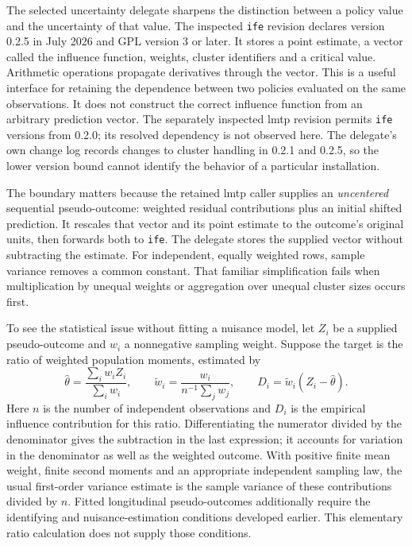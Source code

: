 The selected uncertainty delegate sharpens the distinction between a policy
value and the uncertainty of that value. The inspected \texttt{ife} revision
declares version 0.2.5 in July 2026 and GPL version 3 or later. It stores a
point estimate, a vector called the influence function, weights, cluster
identifiers and a critical value. Arithmetic operations propagate derivatives
through the vector. This is a useful interface for retaining the dependence
between two policies evaluated on the same observations. It does not construct
the correct influence function from an arbitrary prediction vector. The
separately inspected lmtp revision permits \texttt{ife} versions from 0.2.0;
its resolved dependency is not observed here. The delegate's own change log
records changes to cluster handling in 0.2.1 and 0.2.5, so the lower version
bound cannot identify the behavior of a particular installation.
\citep{rel23ife,exec22_lmtp_reuse}

The boundary matters because the retained lmtp caller supplies an
\emph{uncentered} sequential pseudo-outcome: weighted residual contributions
plus an initial shifted prediction. It rescales that vector and its point
estimate to the outcome's original units, then forwards both to \texttt{ife}.
The delegate stores the supplied vector without subtracting the estimate.
For independent, equally weighted rows, sample variance removes a common
constant. That familiar simplification fails when multiplication by unequal
weights or aggregation over unequal cluster sizes occurs first.
\citep{exec22_lmtp_reuse,rel23ifecaller,rel23ife}

To see the statistical issue without fitting a nuisance model, let $Z_i$ be
a supplied pseudo-outcome and $w_i$ a nonnegative sampling weight. Suppose
the target is the ratio of weighted population moments, estimated by
\begin{equation}
 \widehat\theta=\frac{\sum_i w_iZ_i}{\sum_i w_i},\qquad
 \widetilde w_i=\frac{w_i}{n^{-1}\sum_j w_j},\qquad
 D_i=\widetilde w_i(Z_i-\widehat\theta).
 \label{rel23:weighted-influence}
\end{equation}
Here $n$ is the number of independent observations and $D_i$ is the empirical
influence contribution for this ratio. Differentiating the numerator divided
by the denominator gives the subtraction in the last expression; it accounts
for variation in the denominator as well as the weighted outcome. With
positive finite mean weight, finite second moments and an appropriate
independent sampling law, the usual first-order variance estimate is the
sample variance of these contributions divided by $n$. Fitted longitudinal
pseudo-outcomes additionally require the identifying and nuisance-estimation
conditions developed earlier. This elementary ratio calculation does not
supply those conditions. \citep{rel23ifewitness}

